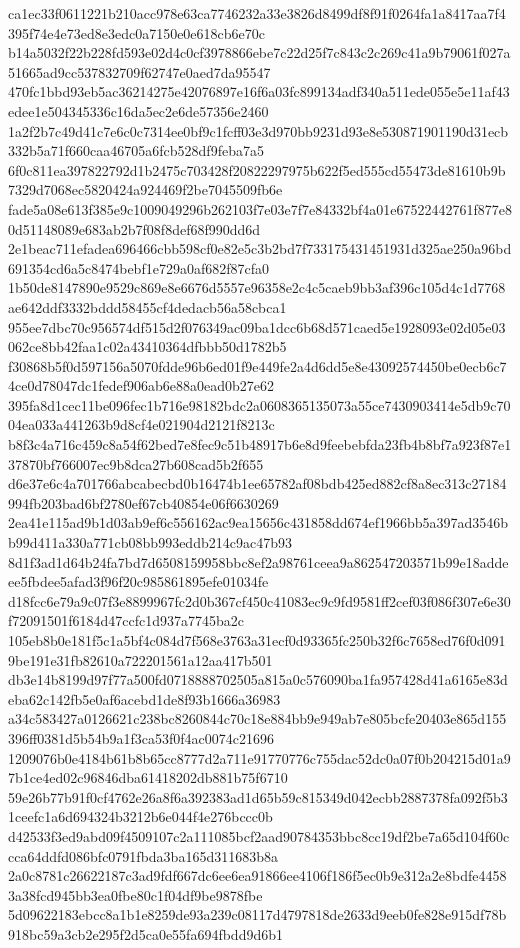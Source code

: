 \documentclass[11pt,a4paper]{article}
\begin{document}
{ca1ec33f0611221b210acc978e63ca7746232a33e3826d8499df8f91f0264fa1a8417aa7f4395f74e4e73ed8e3edc0a7150e0e618cb6e70c
b14a5032f22b228fd593e02d4c0cf3978866ebe7c22d25f7c843c2c269c41a9b79061f027a51665ad9cc537832709f62747e0aed7da95547
470fc1bbd93eb5ac36214275e42076897e16f6a03fc899134adf340a511ede055e5e11af43edee1e504345336c16da5ec2e6de57356e2460
1a2f2b7c49d41c7e6c0c7314ee0bf9c1fcff03e3d970bb9231d93e8e530871901190d31ecb332b5a71f660caa46705a6fcb528df9feba7a5
6f0c811ea397822792d1b2475c703428f20822297975b622f5ed555cd55473de81610b9b7329d7068ec5820424a924469f2be7045509fb6e
fade5a08e613f385e9c1009049296b262103f7e03e7f7e84332bf4a01e67522442761f877e80d51148089e683ab2b7f08f8def68f990dd6d
2e1beac711efadea696466cbb598cf0e82e5c3b2bd7f733175431451931d325ae250a96bd691354cd6a5c8474bebf1e729a0af682f87cfa0
1b50de8147890e9529c869e8e6676d5557e96358e2c4c5caeb9bb3af396c105d4c1d7768ae642ddf3332bddd58455cf4dedacb56a58cbca1
955ee7dbc70c956574df515d2f076349ac09ba1dcc6b68d571caed5e1928093e02d05e03062ce8bb42faa1c02a43410364dfbbb50d1782b5
f30868b5f0d597156a5070fdde96b6ed01f9e449fe2a4d6dd5e8e43092574450be0ecb6c74ce0d78047dc1fedef906ab6e88a0ead0b27e62
395fa8d1cec11be096fec1b716e98182bdc2a0608365135073a55ce7430903414e5db9c7004ea033a441263b9d8cf4e021904d2121f8213c
b8f3c4a716c459c8a54f62bed7e8fec9c51b48917b6e8d9feebebfda23fb4b8bf7a923f87e137870bf766007ec9b8dca27b608cad5b2f655
d6e37e6c4a701766abcabecbd0b16474b1ee65782af08bdb425ed882cf8a8ec313c27184994fb203bad6bf2780ef67cb40854e06f6630269
2ea41e115ad9b1d03ab9ef6c556162ac9ea15656c431858dd674ef1966bb5a397ad3546bb99d411a330a771cb08bb993eddb214c9ac47b93
8d1f3ad1d64b24fa7bd7d6508159958bbc8ef2a98761ceea9a862547203571b99e18addeee5fbdee5afad3f96f20c985861895efe01034fe
d18fcc6e79a9c07f3e8899967fc2d0b367cf450c41083ec9c9fd9581ff2cef03f086f307e6e30f72091501f6184d47ccfc1d937a7745ba2c
105eb8b0e181f5c1a5bf4c084d7f568e3763a31ecf0d93365fc250b32f6c7658ed76f0d0919be191e31fb82610a722201561a12aa417b501
db3e14b8199d97f77a500fd0718888702505a815a0c576090ba1fa957428d41a6165e83deba62c142fb5e0af6acebd1de8f93b1666a36983
a34c583427a0126621c238bc8260844c70c18e884bb9e949ab7e805bcfe20403e865d155396ff0381d5b54b9a1f3ca53f0f4ac0074c21696
1209076b0e4184b61b8b65cc8777d2a711e91770776c755dac52dc0a07f0b204215d01a97b1ce4ed02c96846dba61418202db881b75f6710
59e26b77b91f0cf4762e26a8f6a392383ad1d65b59c815349d042ecbb2887378fa092f5b31ceefc1a6d694324b3212b6e044f4e276bccc0b
d42533f3ed9abd09f4509107c2a111085bcf2aad90784353bbc8cc19df2be7a65d104f60ccca64ddfd086bfc0791fbda3ba165d311683b8a
2a0c8781c26622187c3ad9fdf667dc6ee6ea91866ee4106f186f5ec0b9e312a2e8bdfe44583a38fcd945bb3ea0fbe80c1f04df9be9878fbe
5d09622183ebcc8a1b1e8259de93a239c08117d4797818de2633d9eeb0fe828e915df78b918bc59a3cb2e295f2d5ca0e55fa694fbdd9d6b1
}
\end{document}
